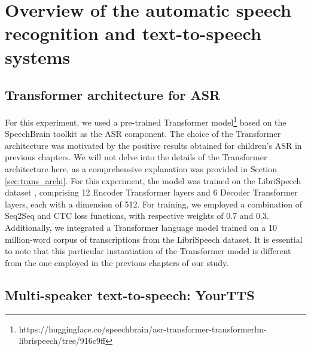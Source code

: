 \section{Overview of the automatic speech recognition and text-to-speech systems}
\label{section:SOA}
\subsection{Transformer architecture for ASR}

For this experiment, we used a pre-trained Transformer model\footnote{https://huggingface.co/speechbrain/asr-transformer-transformerlm-librispeech/tree/916c9ff} based on the SpeechBrain toolkit \cite{speechbrain} as the \ac{ASR} component. The choice of the Transformer architecture was motivated by the positive results obtained for children's \ac{ASR} in previous chapters. We will not delve into the details of the Transformer architecture here, as a comprehensive explanation was provided in Section \ref{sec:trans_archi}. For this experiment, the model was trained on the LibriSpeech dataset \cite{librispeech}, comprising 12 Encoder Transformer layers and 6 Decoder Transformer layers, each with a dimension of 512. For training, we employed a combination of \ac{Seq2Seq} and \ac{CTC} loss functions, with respective weights of 0.7 and 0.3. Additionally, we integrated a Transformer language model trained on a 10 million-word corpus of transcriptions from the LibriSpeech dataset.
It is essential to note that this particular instantiation of the Transformer model is different from the one employed in the previous chapters of our study. 


\subsection{Multi-speaker text-to-speech: YourTTS}

